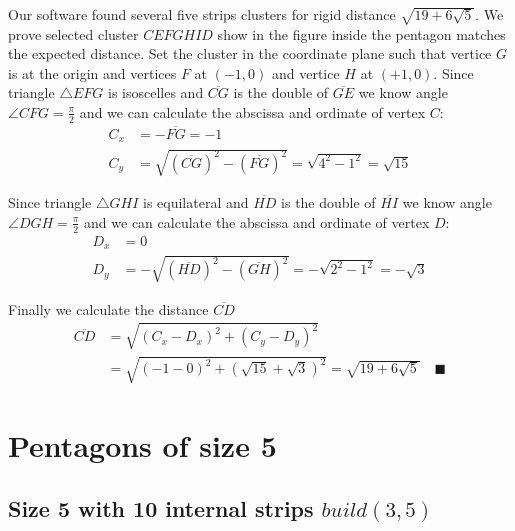 \documentclass[11pt]{article}
\begin{document}
Our software found several five strips clusters for rigid distance $\sqrt{19+6\sqrt5}$. We prove selected cluster $CEFGHID$ show in the figure inside the pentagon matches the expected distance. Set the cluster in the coordinate plane such that vertice $G$ is at the origin and vertices $F$ at $(-1,0)$ and vertice $H$ at $(+1,0)$.
Since triangle $\triangle{EFG}$ is isoscelles and $\overline{CG}$ is the double of $\overline{GE}$ we know angle $\angle{CFG} = \frac{\pi}2$ and we can calculate the abscissa and ordinate of vertex $C$:
\begin{align}
C_x &= -\overline{FG} = -1 \\
C_y &= \sqrt{(\overline{CG})^2 - (\overline{FG})^2} = \sqrt{4^2 - 1^2} = \sqrt{15}
\end{align}

Since triangle $\triangle{GHI}$ is equilateral and $\overline{HD}$ is the double of $\overline{HI}$ we know angle $\angle{DGH} = \frac{\pi}2$ and we can calculate the abscissa and ordinate of vertex $D$:
\begin{align}
D_x &= 0 \\
D_y &= -\sqrt{(\overline{HD})^2 - (\overline{GH})^2} = -\sqrt{2^2 - 1^2} = -\sqrt3
\end{align}

Finally we calculate the distance $\overline{CD}$
\begin{align}
\overline{CD} &= \sqrt{(C_x - D_x)^2 + (C_y - D_y)^2} \nonumber\\
 &= \sqrt{(-1 - 0)^2 + (\sqrt{15} + \sqrt{3})^2} = \sqrt{19 + 6\sqrt5} \quad\blacksquare
\end{align}


\section{Pentagons of size 5}

\subsection{Size 5 with 10 internal strips $build(3,5)$}
\end{document}
